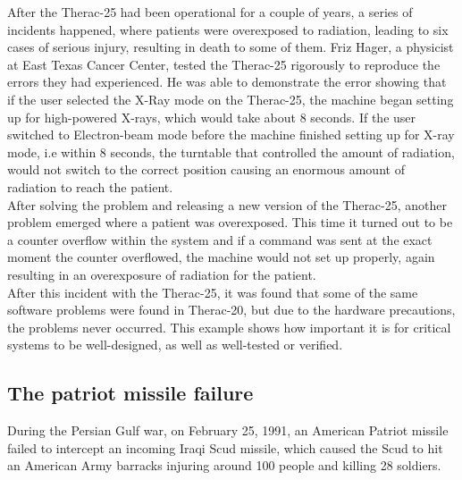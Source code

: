 After the Therac-25 had been operational for a couple of years, a series of incidents happened, where patients were overexposed to radiation, leading to six cases of serious injury, resulting in death to some of them. Friz Hager, a physicist at East Texas Cancer Center, tested the Therac-25 rigorously to reproduce the errors they had experienced. He was able to demonstrate the error showing that if the user selected the X-Ray mode on the Therac-25, the machine began setting up for high-powered X-rays, which would take about 8 seconds. If the user switched to Electron-beam mode before the machine finished setting up for X-ray mode, i.e within 8 seconds, the turntable that controlled the amount of radiation, would not switch to the correct position causing an enormous amount of radiation to reach the patient.\\
After solving the problem and releasing a new version of the Therac-25, another problem emerged where a patient was overexposed. This time it turned out to be a counter overflow within the system and if a command was sent at the exact moment the counter overflowed, the machine would not set up properly, again resulting in an overexposure of radiation for the patient. \\
After this incident with the Therac-25, it was found that some of the same software problems were found in Therac-20, but due to the hardware precautions, the problems never occurred.
This example shows how important it is for critical systems to be well-designed, as well as well-tested or verified.

\subsection{The patriot missile failure}
During the Persian Gulf war, on February 25, 1991, an American Patriot missile failed to intercept an incoming Iraqi Scud missile, which caused the Scud to hit an American Army barracks injuring around 100 people and killing 28 soldiers.\\

